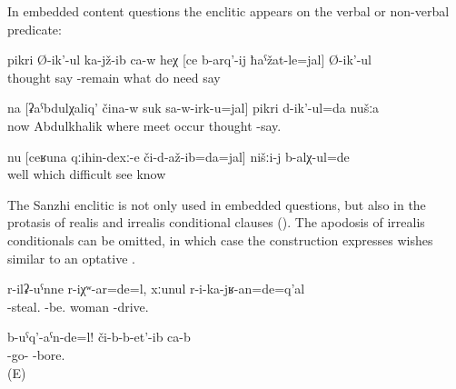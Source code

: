 In embedded content questions the enclitic appears on the verbal or non-verbal predicate:
%
\begin{exe}
	\ex	\label{ex:He is thinking, sitting, about what must be done}
	\gll	pikri	Ø-ik'-ul	ka-jž-ib	ca-w	heχ	[ce		b-arq'-ij	ħaˁžat-le=jal]	Ø-ik'-ul\\
		thought	say	-remain			what	do	need	say\\
	\glt	{}

	\ex	\label{ex:‎‎‎We are thinking where to meet Abdulkhalik}
	\gll	na	[ʡaˁbdulχaliq'	čina-w	suk	sa-w-irk-u=jal]	pikri	d-ik'-ul=da	nušːa	\\
		now	Abdulkhalik	where	meet	occur	thought	-say.	\\
	\glt	{}

	\ex	\label{ex:‎Well we knew which difficulties we had seen}
	\gll	nu	[ceʁuna	qːihin-dexː-e	či-d-až-ib=da=jal]	nišːi-j	b-alχ-ul=de\\
		well	which	difficult	see		know\\
	\glt	{}
\end{exe}

The Sanzhi enclitic is not only used in embedded questions, but also in the protasis of realis and irrealis conditional clauses  (). The apodosis of irrealis conditionals can be omitted, in which case the construction expresses wishes similar to an optative .

\begin{exe}
	\ex	\label{ex:If the woman would have stolen, they would/should have imprisoned her}
	\gll	r-ilʡ-uˁnne	r-iχʷ-ar=de=l,	xːunul r-i-ka-jʁ-an=de=q'al\\
		-steal.	-be.	woman -drive. \\
	\glt	{}
		
	\ex	\label{ex:If they would go! They bore (me).}
	\gll	b-uˁq'-aˁn-de=l!	či-b-b-et'-ib	ca-b\\
		-go-	-bore.	 \\
	\glt	{} (E)
\end{exe}


